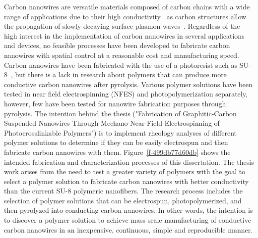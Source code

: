 \documentclass[11pt]{article}
\makeatletter
\def\fixFloatSize#1{}%
\makeatother
\begin{document}
\bgroup
\fixFloatSize{images/dcfb6327-c04e-4015-93c2-25b5927efae4-uthesisoverview.png}
\begin{figure*}[!htbp]
\centering \makeatletter{}
\makeatother 
\caption{{Fabrication process of conductive carbon nanowires. SEM images adapted from\unskip~\protect\cite{691550:18849442}.}}
\label{f-499db77d60db}
\end{figure*}
\egroup
Carbon nanowires are versatile materials composed of carbon chains with a wide range of applications due to their high conductivity\unskip~\cite{691550:18849395} as carbon structures allow the propagation of slowly decaying surface plasmon waves\unskip~\cite{691550:18856327}. Regardless of the high interest in the implementation of carbon nanowires in several applications and devices, no feasible processes have been developed to fabricate carbon nanowires with spatial control at a reasonable cost and manufacturing speed. Carbon nanowires have been fabricated with the use of a photoresist such as SU-8\unskip~\cite{691550:18849438,691550:18849439,691550:18849440,691550:18849441,691550:18849442,691550:18849443}, but there is a lack in research about polymers that can produce more conductive carbon nanowires after pyrolysis. Various polymer solutions have been tested in near field electrospinning (NFES) and photopolymerization separately, however, few have been tested for nanowire fabrication purposes through pyrolysis. The intention behind the thesis ("Fabrication of Graphitic-Carbon Suspended Nanowires Through Mechano-Near-Field Electrospinning of Photocrosslinkable Polymers") is to implement rheology analyses of different polymer solutions to determine if they can be easily electrospun and then fabricate carbon nanowires with them. Figure~\ref{f-499db77d60db} shows the intended fabrication and characterization processes of this dissertation. The thesis work arises from the need to test a greater variety of polymers with the goal to select a polymer solution to fabricate carbon nanowires with better conductivity than the current SU-8 polymeric nanofibers. The research process includes the selection of polymer solutions that can be electrospun, photopolymerized, and then pyrolyzed into conducting carbon nanowires. In other words, the intention is to discover a polymer solution to achieve mass scale manufacturing of conductive carbon nanowires in an inexpensive, continuous, simple and reproducible manner.
\end{document}
